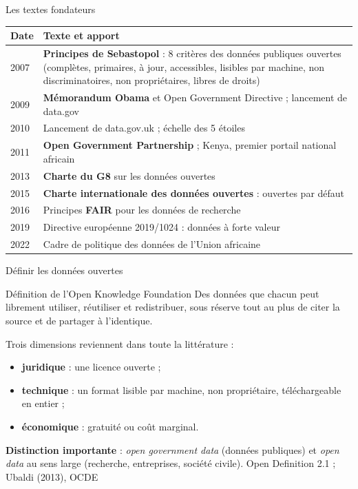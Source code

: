 \documentclass[11pt,aspectratio=169]{beamer}
\newcommand{\refc}[1]{\textcolor{gris}{\footnotesize #1}}
\begin{document}
\begin{frame}{Les textes fondateurs}
  \small
  \begin{tabularx}{\textwidth}{@{}lX@{}}
    \toprule
    \textbf{Date} & \textbf{Texte et apport} \\
    \midrule
    2007 & \textbf{Principes de Sebastopol} : 8 critères des données publiques ouvertes (complètes, primaires, à jour, accessibles, lisibles par machine, non discriminatoires, non propriétaires, libres de droits) \\
    2009 & \textbf{Mémorandum Obama} et Open Government Directive ; lancement de data.gov \\
    2010 & Lancement de data.gov.uk ; échelle des 5 étoiles \\
    2011 & \textbf{Open Government Partnership} ; Kenya, premier portail national africain \\
    2013 & \textbf{Charte du G8} sur les données ouvertes \\
    2015 & \textbf{Charte internationale des données ouvertes} : ouvertes par défaut \\
    2016 & Principes \textbf{FAIR} pour les données de recherche \\
    2019 & Directive européenne 2019/1024 : données à forte valeur \\
    2022 & Cadre de politique des données de l'Union africaine \\
    \bottomrule
  \end{tabularx}
\end{frame}

\begin{frame}{Définir les données ouvertes}
  \begin{block}{Définition de l'Open Knowledge Foundation}
    Des données que chacun peut librement utiliser, réutiliser et redistribuer, sous réserve tout au plus de citer la source et de partager à l'identique.
  \end{block}
  \vspace{0.5em}
  Trois dimensions reviennent dans toute la littérature :
  \begin{itemize}
    \item \textbf{juridique} : une licence ouverte ;
    \item \textbf{technique} : un format lisible par machine, non propriétaire, téléchargeable en entier ;
    \item \textbf{économique} : gratuité ou coût marginal.
  \end{itemize}
  \vspace{0.5em}
  \textbf{Distinction importante} : \emph{open government data} (données publiques) et \emph{open data} au sens large (recherche, entreprises, société civile).
  \vfill
  \refc{Open Definition 2.1 ; Ubaldi (2013), OCDE}
\end{frame}
\end{document}
